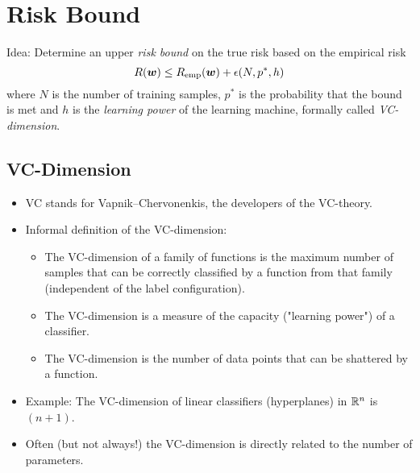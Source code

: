 	\section{Risk Bound}
		Idea: Determine an upper \emph{risk bound} on the true risk based on the empirical risk
		\begin{equation}
			R(\bm{w}) \leq R_{{\operatorname{emp}}}(\bm{w}) + \epsilon(N, p^\ast, h)
		\end{equation}
		where \(N\) is the number of training samples, \(p^\ast\) is the probability that the bound is met and \(h\) is the \emph{learning power} of the learning machine, formally called \emph{VC-dimension}.

		\subsection{VC-Dimension}
			\begin{itemize}
				\item VC stands for Vapnik–Chervonenkis, the developers of the VC-theory.
				\item Informal definition of the VC-dimension:
					\begin{itemize}
						\item The VC-dimension of a family of functions is the maximum number of samples that can be correctly classified by a function from that family (independent of the label configuration).
						\item The VC-dimension is a measure of the capacity ("learning power") of a classifier.
						\item The VC-dimension is the number of data points that can be shattered by a function.
					\end{itemize}
				\item Example: The VC-dimension of linear classifiers (hyperplanes) in \(\mathbb{R}^n\) is \( (n + 1) \).
				\item Often (but not always!) the VC-dimension is directly related to the number of parameters.
			\end{itemize}

